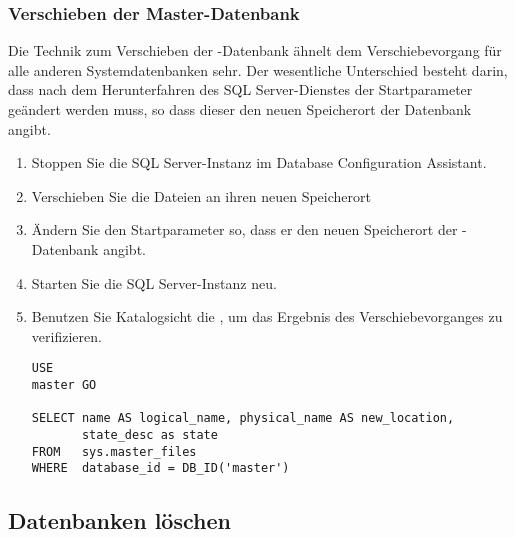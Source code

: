         \subsubsection{Verschieben der Master-Datenbank}
          Die Technik zum Verschieben der -Datenbank ähnelt
          dem Verschiebevorgang für alle anderen Systemdatenbanken sehr. Der
          wesentliche Unterschied besteht darin, dass nach dem Herunterfahren
          des SQL Server-Dienstes der Startparameter  geändert
          werden muss, so dass dieser den neuen Speicherort der Datenbank
          angibt.
          \begin{enumerate}
              \item Stoppen Sie die SQL Server-Instanz im Database Configuration
              Assistant.
              \item Verschieben Sie die Dateien an ihren neuen Speicherort
              \item Ändern Sie den Startparameter  so, dass er den
              neuen Speicherort der -Datenbank angibt.
              \item Starten Sie die SQL Server-Instanz neu.
              \item Benutzen Sie Katalogsicht die
              , um das Ergebnis des
              Verschiebevorganges zu verifizieren.
                \begin{lstlisting}[language=ms_sql,caption={Abfragen
                der View \identifier{sys.master\_files}},label=admin03_24]
USE
master GO

SELECT name AS logical_name, physical_name AS new_location, 
       state_desc as state
FROM   sys.master_files
WHERE  database_id = DB_ID('master')
                \end{lstlisting}
          \end{enumerate}
      \subsection{Datenbanken löschen}

